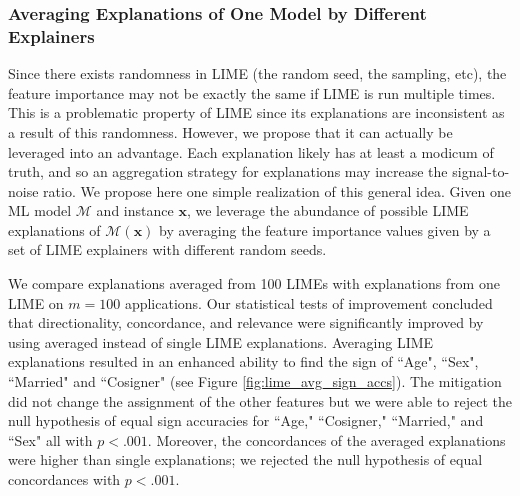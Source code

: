 \documentclass[12pt]{article}  %
\begin{document}
            \subsubsection{Averaging Explanations of One Model by Different Explainers}
            \label{sec:averaging_one_explainer}
            Since there exists randomness in LIME (the random seed, the sampling, etc), the feature importance may not be exactly the same if LIME is run multiple times. This is a problematic property of LIME since its explanations are inconsistent \citep{alvarez18robustness} as a result of this randomness. 
        However, we propose that it can actually be leveraged into an advantage. Each explanation likely has at least a modicum of truth, and so an aggregation strategy for explanations may increase the signal-to-noise ratio. We propose here one simple realization of this general idea. Given one ML model $\mathcal{M}$ and instance $\mathbf{x}$, we leverage the abundance of possible LIME explanations of $\mathcal{M}(\mathbf{x})$ by averaging the feature importance values given by a set of LIME explainers with different random seeds.
        
            We compare explanations averaged from 100 LIMEs with explanations from one LIME on  $m=100$ applications. %
            Our statistical tests of improvement concluded that directionality, concordance, and relevance were significantly improved by using averaged instead of single LIME explanations. Averaging LIME explanations resulted in an enhanced ability to find the sign of ``Age", ``Sex", ``Married" and ``Cosigner" (see Figure \ref{fig:lime_avg_sign_accs}). The mitigation did not change the assignment of the other features but we were able to reject the null hypothesis of equal sign accuracies for ``Age," ``Cosigner," ``Married," and ``Sex" all with $p<.001$. %
            Moreover, the concordances  of the averaged explanations were higher than single explanations; we rejected the null hypothesis of equal concordances with $p<.001$.%
\end{document}
